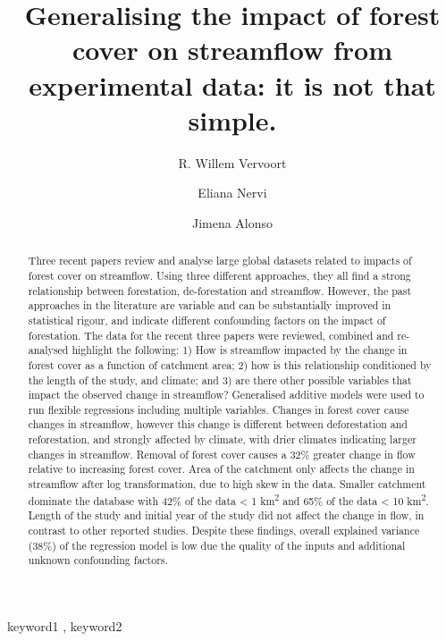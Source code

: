 \documentclass[]{elsarticle} %
\begin{document}
\begin{frontmatter}

  \title{Generalising the impact of forest cover on streamflow from experimental data: it is not that simple.}
    \author[a,b]{R. Willem Vervoort}
    \author[c]{Eliana Nervi}
    \author[d]{Jimena Alonso}
  
  \begin{abstract}
  Three recent papers review and analyse large global datasets related to impacts of forest cover on streamflow. Using three different approaches, they all find a strong relationship between forestation, de-forestation and streamflow. However, the past approaches in the literature are variable and can be substantially improved in statistical rigour, and indicate different confounding factors on the impact of forestation. The data for the recent three papers were reviewed, combined and re-analysed highlight the following: 1) How is streamflow impacted by the change in forest cover as a function of catchment area; 2) how is this relationship conditioned by the length of the study, and climate; and 3) are there other possible variables that impact the observed change in streamflow? Generalised additive models were used to run flexible regressions including multiple variables.
  Changes in forest cover cause changes in streamflow, however this change is different between deforestation and reforestation, and strongly affected by climate, with drier climates indicating larger changes in streamflow. Removal of forest cover causes a 32\% greater change in flow relative to increasing forest cover. Area of the catchment only affects the change in streamflow after log transformation, due to high skew in the data. Smaller catchment dominate the database with 42\% of the data \textless{} 1 km\textsuperscript{2} and 65\% of the data \textless{} 10 km\textsuperscript{2}. Length of the study and initial year of the study did not affect the change in flow, in contrast to other reported studies. Despite these findings, overall explained variance (38\%) of the regression model is low due the quality of the inputs and additional unknown confounding factors.
  \end{abstract}
    \begin{keyword}
    keyword1 \sep 
    keyword2
  \end{keyword}
  
 \end{frontmatter}
\end{document}
